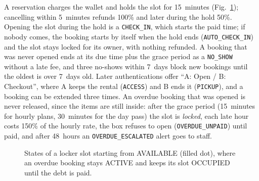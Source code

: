 \documentclass[journal,onecolumn]{IEEEtran}
\begin{document}
A reservation charges the wallet and holds the slot for 15~minutes (Fig.~\ref{fig:state}); cancelling within
5~minutes refunds 100\% and later during the hold 50\%. Opening the slot during the hold is a \texttt{CHECK\_IN}, which
starts the paid time; if nobody comes, the booking starts by itself when the hold ends (\texttt{AUTO\_CHECK\_IN}) and
the slot stays locked for its owner, with nothing refunded. A booking that was never opened ends at its due time plus
the grace period as a \texttt{NO\_SHOW} without a late fee, and three no-shows within 7~days block new bookings until
the oldest is over 7~days old. Later authentications offer ``A: Open / B: Checkout'', where A keeps the rental
(\texttt{ACCESS}) and B ends it (\texttt{PICKUP}), and a booking can be extended three times. An overdue booking that
was opened is never released, since the items are still inside: after the grace period (15~minutes for hourly plans,
30~minutes for the day pass) the slot is \emph{locked}, each late hour costs 150\% of the hourly rate, the box refuses
to open (\texttt{OVERDUE\_UNPAID}) until paid, and after 48~hours an \texttt{OVERDUE\_ESCALATED} alert goes to staff.

\begin{figure}[!htbp]
\centering
{}
\caption{States of a locker slot starting from AVAILABLE (filled dot), where an overdue booking stays ACTIVE and keeps
its slot OCCUPIED until the debt is paid.}
\label{fig:state}
\end{figure}
\end{document}
